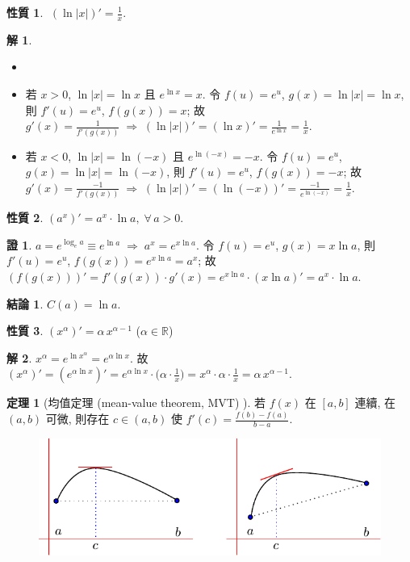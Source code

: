 \documentclass[12pt,a4paper]{extarticle}
\newcommand{\ds}{\displaystyle}
\newcommand{\ie}{\;\Longrightarrow\;}
\theoremstyle{definition}
\newtheorem*{prp}{性質}
\newtheorem*{fact}{結論}
\newtheorem*{thm}{定理}
\newtheorem*{sol}{解}
\newtheorem*{prf}{證}
\begin{document}
\begin{prp}
  $\ds\;(\ln |x|)' = \frac{1}{x}$. 
\end{prp}

\begin{sol}
  \begin{itemize}
    \item[]
    \item 若 $x > 0$, $\ln |x| = \ln x$ 且 $\ds e^{\ln x} = x$. 令 $f(u) = e^u$, $g(x) = \ln|x| = \ln x$, 則 $\ds f'(u) = e^u$, $\ds f(g(x)) = x$; 故 $\ds g'(x) = \frac{1}{f'(g(x))}\ie (\ln|x|)' = (\ln x)' = \frac{1}{e^{\ln x}} = \frac{1}{x}$. 
    \item 若 $x < 0$, $\ln |x| = \ln(-x)$ 且 $\ds e^{\ln(-x)} = -x$. 令 $f(u) = e^u$, $g(x) = \ln|x| = \ln(-x)$, 則 $\ds f'(u) = e^u$, $\ds f(g(x)) = -x$; 故 $\ds g'(x) = \frac{-1}{f'(g(x))}\ie (\ln|x|)' = (\ln(-x))' = \frac{-1}{e^{\ln(-x)}} = \frac{1}{x}$. 
  \end{itemize}
\end{sol}

\begin{prp}
  $\ds(a^x)' = a^x\cdot\ln a,\;\forall\,a > 0$. 
\end{prp}

\begin{prf}
  $\ds a = e^{\log_e a} \equiv e^{\ln a} \ie a^x = e^{x\ln a}$. 令 $f(u) = e^u$, $g(x) = x\ln a$, 則 $\ds f'(u) = e^u$, $\ds f(g(x)) = e^{x\ln a} = a^x$; 故 $(f(g(x)))' = f'(g(x))\cdot g'(x) = e^{x\ln a}\cdot(x\ln a)' = a^x\cdot\ln a$. 
\end{prf}

\begin{fact}
  $\ds C(a) = \ln a$. 
\end{fact}

\begin{prp}
  $\ds (x^\alpha)' = \alpha\,x^{\alpha - 1}$ ($\alpha\in\mathbb{R}$) 
\end{prp}

\begin{sol}
  $\ds x^\alpha = e^{\ln x^\alpha} = e^{\alpha\ln x}$. 故 $\ds(x^\alpha)' = (e^{\alpha\ln x})' = e^{\alpha\ln x}\cdot\big(\alpha\cdot\frac{1}{x}\big) = x^\alpha\cdot\alpha\cdot\frac{1}{x} = \alpha\,x^{\alpha - 1}$. 
\end{sol}

\begin{thm}[均值定理 (mean-value theorem, MVT) ]
  若 $f(x)$ 在 $[a, b]$ 連續, 在 $(a, b)$ 可微, 則存在 $\ds c\in (a, b)$ 使 $\ds f'(c) = \frac{f(b) - f(a)}{b - a}$. 
\end{thm}
\vspace{-5mm}
\begin{figure}[!htbp]
  \centering
  \includegraphics[scale=1,page=1]{fig/rolle_to_mvt.pdf}
\end{figure}
\end{document}
